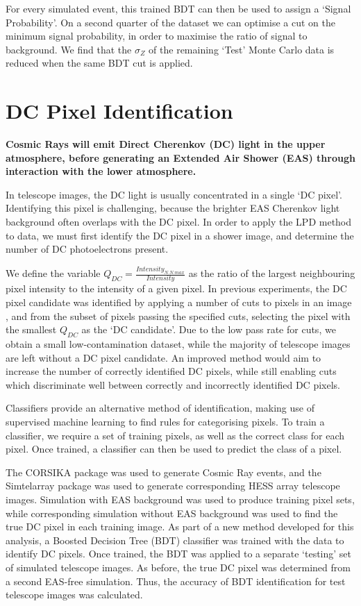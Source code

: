 \documentclass{article}
\begin{document}
For every simulated event, this trained BDT can then be used to assign a \textquoteleft Signal Probability'. On a second quarter of the dataset we can optimise a cut on the minimum signal probability, in order to maximise the ratio of signal to background. We find that the $\sigma_{Z}$ of the remaining \textquoteleft Test' Monte Carlo data is reduced when the same BDT cut is applied.

\section{DC Pixel Identification}
\textbf{Cosmic Rays will emit Direct Cherenkov (DC) light in the upper atmosphere, before generating an Extended Air Shower (EAS) through interaction with the lower atmosphere. }

In telescope images, the DC light is usually concentrated in a single  \textquoteleft DC pixel'. Identifying this pixel is challenging, because the brighter EAS Cherenkov light background often overlaps with the DC pixel. In order to apply the LPD method to data, we must first identify the DC pixel in a shower image, and determine the number of DC photoelectrons present. 

We define the variable $Q_{DC} = \frac{Intensity_{N.N.max}}{Intensity}$ as the ratio of the largest neighbouring pixel intensity to the intensity of a given pixel. In previous experiments, the DC pixel candidate was identified by applying a number of cuts to pixels in an image \cite{hess07}, and from the subset of pixels passing the specified cuts, selecting the pixel with the smallest $Q_{DC}$ as the \textquoteleft DC candidate'. Due to the low pass rate for cuts, we obtain a small low-contamination dataset, while the majority of telescope images are left without a DC pixel candidate. An improved method would aim to increase the number of correctly identified DC pixels, while still enabling cuts which discriminate well between correctly and incorrectly identified DC pixels.

Classifiers provide an alternative method of identification, making use of supervised machine learning to find rules for categorising pixels. To train a classifier, we require a set of training pixels, as well as the correct class for each pixel. Once trained, a classifier can then be used to predict the class of a pixel.

The CORSIKA package \cite{Heck98} was used to generate Cosmic Ray events, and the Sim\textunderscore telarray package  \cite{Bernlohr08} was used to generate corresponding HESS array telescope images.  Simulation with EAS background was used to produce training pixel sets, while corresponding simulation without EAS background was used to find the true DC pixel in each training image. As part of a new method developed for this analysis, a Boosted Decision Tree (BDT) classifier was trained with the data to identify DC pixels. Once trained, the BDT was applied to a separate \textquoteleft testing' set of simulated telescope images. As before, the true DC pixel was determined from a second EAS-free simulation. Thus, the accuracy of BDT identification for test telescope images was calculated.
\end{document}
